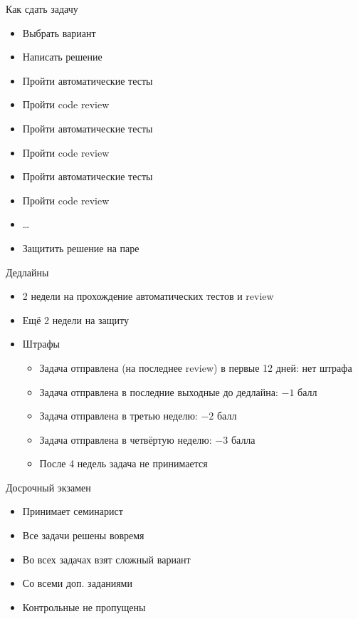 \documentclass[aspectratio=169,14pt]{beamer}
\begin{document}
    \begin{frame}{Как сдать задачу}
        \begin{itemize}
            \item Выбрать вариант
            \item Написать решение
            \item Пройти автоматические тесты
            \item Пройти code review
            \item<2-> Пройти автоматические тесты
            \item<2-> Пройти code review
            \item<3-> Пройти автоматические тесты
            \item<3-> Пройти code review
            \item<4-> \dots
            \item<5-> Защитить решение на паре
        \end{itemize}
    \end{frame}

    \begin{frame}{Дедлайны}
        \begin{itemize}
            \item 2 недели на прохождение автоматических тестов и review
            \item Ещё 2 недели на защиту
            \item Штрафы
                \begin{itemize}
                    \item Задача отправлена (на последнее review) в первые 12 дней: нет штрафа
                    \item Задача отправлена в последние выходные до дедлайна: $-1$ балл
                    \item Задача отправлена в третью неделю: $-2$ балл
                    \item Задача отправлена в четвёртую неделю: $-3$ балла
                    \item После 4 недель задача не принимается
                \end{itemize}
        \end{itemize}
    \end{frame}

    \begin{frame}{Досрочный экзамен}
        \begin{itemize}
            \item Принимает семинарист
            \item Все задачи решены вовремя
            \item Во всех задачах взят сложный вариант
            \item Со всеми доп. заданиями
            \item Контрольные не пропущены
        \end{itemize}
    \end{frame}
\end{document}
